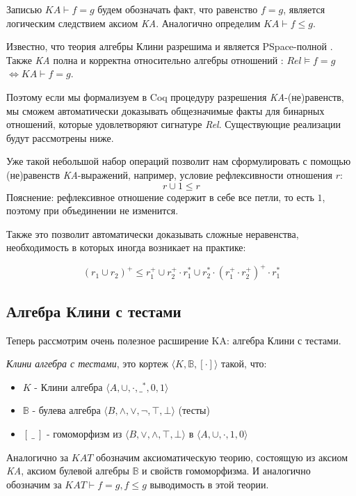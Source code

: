 \documentclass[times
              ,specification
              ,annotation
              ]{itmo-student-thesis}
\begin{document}
      Записью $ \mathit{KA} \vdash f = g $ будем обозначать факт, что равенство $ f = g $, является
      логическим следствием аксиом \textit{KA}.
      Аналогично определим $ \mathit{KA} \vdash f \leq g $.

      Известно, что теория алгебры Клини разрешима и является PSpace-полной \cite{word_problem_pspace}.
      Также \textit{KA} полна и корректна относительно алгебры отношений \cite{AlgebrasOfRelation}: 
      $ \mathit{Rel} \models f = g $ $ \Leftrightarrow \mathit{KA} \vdash f = g$.

      Поэтому если мы формализуем в Coq процедуру разрешения \textit{KA}-(не)равенств, мы сможем
      автоматически доказывать общезначимые факты для бинарных отношений, которые удовлетворяют
      сигнатуре \textit{Rel}.
      Существующие реализации будут рассмотрены ниже.

      Уже такой небольшой набор операций позволит нам сформулировать с помощью (не)равенств
      \textit{KA}-выражений, например, условие рефлексивности отношения $ r $:
      $$ r \cup 1 \leq r $$
      Пояснение: рефлексивное отношение содержит в себе все петли, то есть $ 1 $, поэтому при
      объединении не изменится.

      Также это позволит автоматически доказывать сложные неравенства, необходимость в которых иногда
      возникает на практике:

      $$ (r_1 \cup r_2)^+ \leq r_1^+ \cup r_2^+ \cdot r_1^* \cup r_2^* \cdot (r_1^+ \cdot r_2^+)^+ \cdot r_1^* $$

    \subsection{Алгебра Клини с тестами}
      Теперь рассмотрим очень полезное расширение KA: алгебра Клини с тестами.

      \textit{Клини алгебра с тестами}, это кортеж $\langle K,\mathbb{B}, [\cdot] \rangle$ такой, что:

      \begin{itemize}
        \item $K$ - Клини алгебра $\langle A, \cup, \cdot, \_^*, 0, 1 \rangle $
        \item $\mathbb{B}$ - булева алгебра $\langle B, \wedge, \vee, \neg, \top, \bot \rangle $ (тесты)
        \item $[\:\_\:]$ - гомоморфизм из
          $\langle B, \vee, \wedge, \top, \bot \rangle$
        в $\langle A, \cup,  \cdot, 1, 0 \rangle$
      \end{itemize}
      Аналогично за $ \mathit{KAT} $ обозначим аксиоматическую теорию, состоящую из аксиом \textit{KA},
      аксиом булевой алгебры $ \mathbb{B}$ и свойств гомоморфизма.
      И аналогично обозначим за $ KAT \vdash f = g, f \leq g $ выводимость в этой теории.
\end{document}
